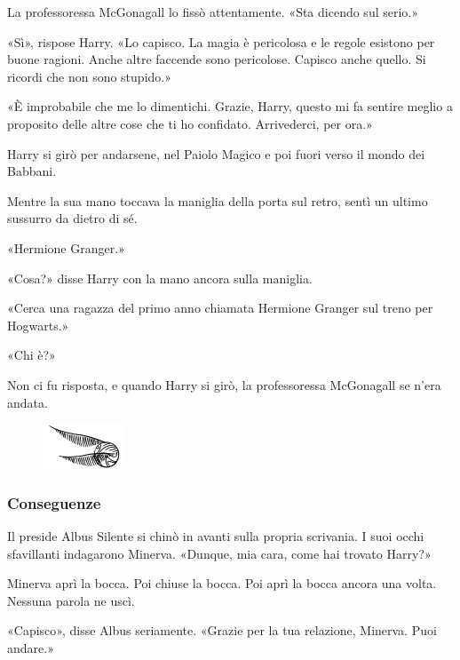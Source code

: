 La professoressa McGonagall lo fissò attentamente. «Sta dicendo sul serio.»

«Sì», rispose Harry. «Lo capisco. La magia è pericolosa e le regole esistono per buone ragioni. Anche altre faccende sono pericolose. Capisco anche quello. Si ricordi che non sono stupido.»

«È improbabile che me lo dimentichi. Grazie, Harry, questo mi fa sentire meglio a proposito delle altre cose che ti ho confidato. Arrivederci, per ora.»

Harry si girò per andarsene, nel Paiolo Magico e poi fuori verso il mondo dei Babbani.

Mentre la sua mano toccava la maniglia della porta sul retro, sentì un ultimo sussurro da dietro di sé.

«Hermione Granger.»

«Cosa?» disse Harry con la mano ancora sulla maniglia.

«Cerca una ragazza del primo anno chiamata Hermione Granger sul treno per Hogwarts.»

«Chi è?»

Non ci fu risposta, e quando Harry si girò, la professoressa McGonagall se n’era andata.

\begin{figure}[h]
	\includegraphics[scale=0.4]{boccino.png}
	\centering
\end{figure}

\subsubsection{Conseguenze}

Il preside Albus Silente si chinò in avanti sulla propria scrivania. I suoi occhi sfavillanti indagarono Minerva. «Dunque, mia cara, come hai trovato Harry?»

Minerva aprì la bocca. Poi chiuse la bocca. Poi aprì la bocca ancora una volta. Nessuna parola ne uscì.

«Capisco», disse Albus seriamente. «Grazie per la tua relazione, Minerva. Puoi andare.»
